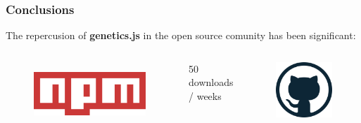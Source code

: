\documentclass{beamer}
\begin{document}
\begin{frame}
\frametitle{Conclusions}

 The repercusion of \textbf{genetics.js} in the open source comunity has been significant:
 
 \begin{columns}
    \centering
    \begin{figure}
        \centering
        \includegraphics[scale=0.06]{mem/images/cap-4/4.1.1(JS)/npm-logo.png}
        \label{fig:my_label}
    \end{figure}
    \begin{center}
        50 downloads / weeks
    \end{center}
    \begin{figure}
        \centering
        \includegraphics[scale=0.13]{mem/images/cap-4/4.1.2(desarrollo)/github-logo.png}

\end{figure}
\end{columns}
\end{frame}
\end{document}
